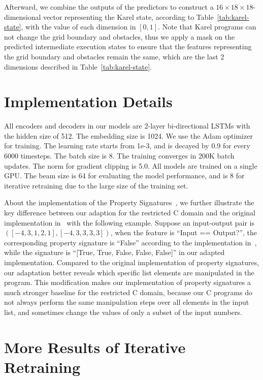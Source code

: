 Afterward, we combine the outputs of the predictors to construct a $16 \times 18 \times 18$-dimensional vector representing the Karel state, according to Table~\ref{tab:karel-state}, with the value of each dimension in $[0, 1]$. Note that Karel programs can not change the grid boundary and obstacles, thus we apply a mask on the predicted intermediate execution states to ensure that the features representing the grid boundary and obstacles remain the same, which are the last 2 dimensions described in Table~\ref{tab:karel-state}.

\section{Implementation Details}
\label{app:implementation-details}

All encoders and decoders in our models are 2-layer bi-directional LSTMs with the hidden size of 512. The embedding size is 1024. We use the Adam optimizer~\cite{kingma2014adam} for training. The learning rate starts from 1e-3, and is decayed by 0.9 for every 6000 timesteps. The batch size is 8. The training converges in 200K batch updates. The norm for gradient clipping is 5.0. All models are trained on a single GPU. The beam size is 64 for evaluating the model performance, and is 8 for iterative retraining due to the large size of the training set.

About the implementation of the Property Signatures~\cite{odena2020learning}, we further illustrate the key difference between our adaption for the restricted C domain and the original implementation in~\cite{odena2020learning} with the following example. Suppose an input-output pair is $([-4, 3, 1, 2, 1], [-4, 3, 3, 3, 3])$, when the feature is ``Input == Output?'', the corresponding property signature is ``False'' according to the implementation in~\cite{odena2020learning}, while the signature is ``[True, True, False, False, False]'' in our adapted implementation. Compared to the original implementation of property signatures, our adaptation better reveals which specific list elements are manipulated in the program. This modification makes our implementation of property signatures a much stronger baseline for the restricted C domain, because our C programs do not always perform the same manipulation steps over all elements in the input list, and sometimes change the values of only a subset of the input numbers.

\section{More Results of Iterative Retraining}
\label{app:retrain}

